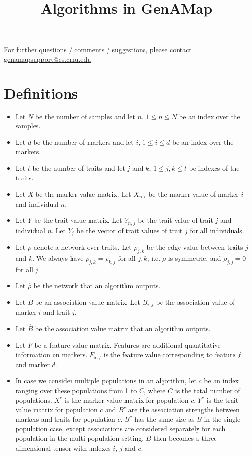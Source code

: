 \documentclass{article}
\title{Algorithms in GenAMap}
\author{}
\date{}
\begin{document}
\maketitle
\tableofcontents
\vspace{1cm}

For further questions / comments / suggestions, please contact \url{genamapsupport@cs.cmu.edu}



\section{Definitions}

\begin{itemize}
\item Let $N$ be the number of samples and let $n$, $1 \le n \le N$ be an index over the samples.
\item Let $d$ be the number of markers and let $i$, $1 \le i \le d$ be an index over the markers.
\item Let $t$ be the number of traits and let $j$ and $k$, $1 \le j,k \le t$ be indexes of the traits.
\item Let $X$ be the marker value matrix. Let $X_{n,i}$ be the marker value of marker $i$ and individual $n$. 
\item Let $Y$ be the trait value matrix. Let $Y_{n,j}$ be the trait value of trait $j$ and individual $n$. Let $Y_j$ be the vector of trait values of trait $j$ for all individuals.
\item Let $\rho$ denote a network over traits. Let $\rho_{j,k}$ be the edge value between traits $j$ and $k$. We always have $\rho_{j,k} = \rho_{k,j}$ for all $j,k$, i.e. $\rho$ is symmetric, and $\rho_{j,j} = 0$ for all $j$.
\item Let $\hat{\rho}$ be the network that an algorithm outputs.
\item Let $B$ be an association value matrix. Let $B_{i,j}$ be the association value of marker $i$ and trait $j$. 
\item Let $\hat{B}$ be the association value matrix that an algorithm outputs.
\item Let $F$ be a feature value matrix. Features are additional quantitative information on markers. $F_{d,f}$ is the feature value corresponding to feature $f$ and marker $d$.
\item In case we consider multiple populations in an algorithm, let $c$ be an index ranging over these populations from 1 to $C$, where $C$ is the total number of populations. $X^c$ is the marker value matrix for population $c$, $Y^c$ is the trait value matrix for population $c$ and $B^c$ are the association strengths between markers and traits for population $c$. $B^c$ has the same size as $B$ in the single-population case, except associations are considered separately for each population in the multi-population setting. $B$ then becomes a three-dimensional tensor with indexes $i$, $j$ and $c$.

\end{itemize}
\end{document}
